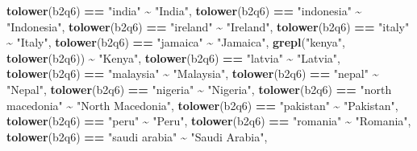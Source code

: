 \documentclass[
]{article}
\newenvironment{Shaded}{\begin{snugshade}}{\end{snugshade}}
\newcommand{\FunctionTok}[1]{\textcolor[rgb]{0.13,0.29,0.53}{\textbf{#1}}}
\newcommand{\NormalTok}[1]{#1}
\newcommand{\SpecialCharTok}[1]{\textcolor[rgb]{0.81,0.36,0.00}{\textbf{#1}}}
\newcommand{\StringTok}[1]{\textcolor[rgb]{0.31,0.60,0.02}{#1}}
\begin{document}
\begin{Shaded}
\begin{Highlighting}[]
    \FunctionTok{tolower}\NormalTok{(b2q6) }\SpecialCharTok{==} \StringTok{"india"}                          \SpecialCharTok{\textasciitilde{}} \StringTok{"India"}\NormalTok{,}
    \FunctionTok{tolower}\NormalTok{(b2q6) }\SpecialCharTok{==} \StringTok{"indonesia"}                      \SpecialCharTok{\textasciitilde{}} \StringTok{"Indonesia"}\NormalTok{,}
    \FunctionTok{tolower}\NormalTok{(b2q6) }\SpecialCharTok{==} \StringTok{"ireland"}                        \SpecialCharTok{\textasciitilde{}} \StringTok{"Ireland"}\NormalTok{,}
    \FunctionTok{tolower}\NormalTok{(b2q6) }\SpecialCharTok{==} \StringTok{"italy"}                          \SpecialCharTok{\textasciitilde{}} \StringTok{"Italy"}\NormalTok{,}
    \FunctionTok{tolower}\NormalTok{(b2q6) }\SpecialCharTok{==} \StringTok{"jamaica"}                        \SpecialCharTok{\textasciitilde{}} \StringTok{"Jamaica"}\NormalTok{,}
    \FunctionTok{grepl}\NormalTok{(}\StringTok{"kenya"}\NormalTok{, }\FunctionTok{tolower}\NormalTok{(b2q6))                     }\SpecialCharTok{\textasciitilde{}} \StringTok{"Kenya"}\NormalTok{,}
    \FunctionTok{tolower}\NormalTok{(b2q6) }\SpecialCharTok{==} \StringTok{"latvia"}                         \SpecialCharTok{\textasciitilde{}} \StringTok{"Latvia"}\NormalTok{,}
    \FunctionTok{tolower}\NormalTok{(b2q6) }\SpecialCharTok{==} \StringTok{"malaysia"}                       \SpecialCharTok{\textasciitilde{}} \StringTok{"Malaysia"}\NormalTok{,}
    \FunctionTok{tolower}\NormalTok{(b2q6) }\SpecialCharTok{==} \StringTok{"nepal"}                          \SpecialCharTok{\textasciitilde{}} \StringTok{"Nepal"}\NormalTok{,}
    \FunctionTok{tolower}\NormalTok{(b2q6) }\SpecialCharTok{==} \StringTok{"nigeria"}                        \SpecialCharTok{\textasciitilde{}} \StringTok{"Nigeria"}\NormalTok{,}
    \FunctionTok{tolower}\NormalTok{(b2q6) }\SpecialCharTok{==} \StringTok{"north macedonia"}                \SpecialCharTok{\textasciitilde{}} \StringTok{"North Macedonia"}\NormalTok{,}
    \FunctionTok{tolower}\NormalTok{(b2q6) }\SpecialCharTok{==} \StringTok{"pakistan"}                       \SpecialCharTok{\textasciitilde{}} \StringTok{"Pakistan"}\NormalTok{,}
    \FunctionTok{tolower}\NormalTok{(b2q6) }\SpecialCharTok{==} \StringTok{"peru"}                           \SpecialCharTok{\textasciitilde{}} \StringTok{"Peru"}\NormalTok{,}
    \FunctionTok{tolower}\NormalTok{(b2q6) }\SpecialCharTok{==} \StringTok{"romania"}                        \SpecialCharTok{\textasciitilde{}} \StringTok{"Romania"}\NormalTok{,}
    \FunctionTok{tolower}\NormalTok{(b2q6) }\SpecialCharTok{==} \StringTok{"saudi arabia"}                   \SpecialCharTok{\textasciitilde{}} \StringTok{"Saudi Arabia"}\NormalTok{,}

\end{Highlighting}
\end{Shaded}
\end{document}

